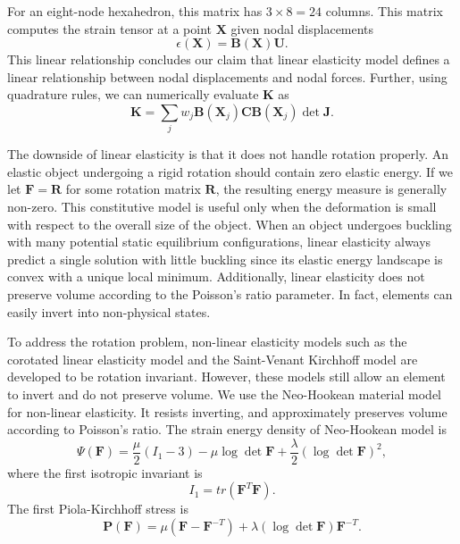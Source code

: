 For an eight-node hexahedron, this matrix has $3\times 8=24$ columns.
This matrix computes the strain tensor at a point $\mathbf{X}$ given nodal displacements
\[
\epsilon(\mathbf{X})=\mathbf{B}(\mathbf{X})\mathbf{U}.
\]
This linear relationship concludes our claim that linear elasticity model defines a linear relationship between nodal displacements and nodal forces.
Further, using quadrature rules, we can numerically evaluate $\mathbf{K}$ as
\[
\mathbf{K}=\sum_j w_j \mathbf{B}(\mathbf{X}_j)\mathbf{C}\mathbf{B}(\mathbf{X}_j)\det \mathbf{J}.
\]

The downside of linear elasticity is that it does not handle rotation properly.
An elastic object undergoing a rigid rotation should contain zero elastic energy.
If we let $\mathbf{F}=\mathbf{R}$ for some rotation matrix $\mathbf{R}$,
the resulting energy measure is generally non-zero.
This constitutive model is useful only when the deformation is small with respect to the overall size of the object.
When an object undergoes buckling with many potential static equilibrium configurations,
linear elasticity always predict a single solution with little buckling since its elastic energy landscape is convex with a unique local minimum.
Additionally, linear elasticity does not preserve volume according to the Poisson's ratio parameter. In fact, elements can easily invert into non-physical states.

To address the rotation problem, non-linear elasticity models such as the corotated linear elasticity model and the Saint-Venant Kirchhoff model are developed to be rotation invariant.
However, these models still allow an element to invert and do not preserve volume.
We use the Neo-Hookean material model for non-linear elasticity. It resists inverting, and approximately preserves volume according to Poisson's ratio.
The strain energy density of Neo-Hookean model is
\[
\Psi(\mathbf{F})=\frac{\mu}{2}(I_1-3) - \mu \log \det \mathbf{F} 
+ \frac{\lambda}{2}(\log \det \mathbf{F})^2,
\]
where the first isotropic invariant is 
\[
I_1=tr(\mathbf{F}^T\mathbf{F}).
\]
The first Piola-Kirchhoff stress is
\[
\mathbf{P}(\mathbf{F})=\mu(\mathbf{F}-\mathbf{F}^{-T})+\lambda(\log\det\mathbf{F})\mathbf{F}^{-T}.
\]
